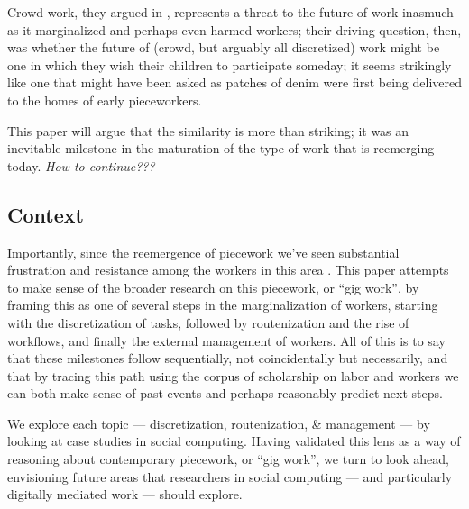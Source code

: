 \documentclass{sigchi}
\begin{document}

Crowd work,
they argued in \citeyear{crowdworkFuture},
represents a threat to the future of work inasmuch as it marginalized
and perhaps even harmed
workers;
their driving question, then, was
whether the future of
(crowd, but arguably all discretized)
work might be one in which they wish their children to participate someday;
it seems strikingly like one that might have been asked
as patches of denim were first being delivered to the homes of early pieceworkers.

This paper will argue that the similarity is more than striking;
it was an inevitable milestone in the maturation of the type of work that is reemerging today.
\textit{How to continue???}




\subsection{Context}
Importantly, since the reemergence of piecework we've seen substantial frustration
and resistance among the workers in this area
\cite{uberAlgorithm,turkopticon,dynamo}.
This paper attempts to make sense of the broader research on this piecework,
or ``gig work'', by framing this as one of several steps in the marginalization of workers,
starting with the discretization of tasks,
followed by routenization and the rise of workflows,
and finally the external management of workers.
All of this is to say that these milestones follow sequentially,
not coincidentally but necessarily,
and that by tracing this path using the corpus of scholarship on labor and workers
we can both make sense of past events and perhaps reasonably predict next steps.

We explore each topic
--- discretization, routenization, \& management ---
by looking at case studies in social computing.
Having validated this lens as a way of reasoning about contemporary piecework, or ``gig work'',
we turn to look ahead, envisioning future areas that researchers in social computing
--- and particularly digitally mediated work ---
should explore.
\end{document}
